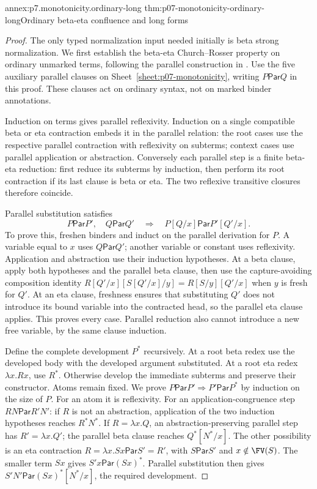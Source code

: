 \begin{annexitem}{annex:p7.monotonicity.ordinary-long}
 {thm:p07-monotonicity-ordinary-long}{Ordinary beta-eta confluence and long forms}
\begin{proof}
The only typed normalization input needed initially is beta strong
normalization. We first establish the beta-eta Church--Rosser property on
ordinary unmarked terms, following the parallel construction in
\cite[Section 4.4]{Selinger2013LambdaNotesV2}.
Use the five auxiliary parallel clauses on
Sheet~\ref{sheet:p07-monotonicity}, writing \(P\mathrel{\mathsf{Par}}Q\)
in this proof. These clauses act on ordinary syntax, not on marked
binder annotations.

Induction on terms gives parallel reflexivity. Induction on a single
compatible beta or eta contraction embeds it in the parallel relation:
the root cases use the respective parallel contraction with reflexivity
on subterms; context cases use parallel application or abstraction.
Conversely each parallel step is a finite beta-eta reduction: first reduce
its subterms by induction, then perform its root contraction if its last
clause is beta or eta. The two reflexive transitive closures therefore
coincide.

Parallel substitution satisfies
\[
 P\mathrel{\mathsf{Par}}P',\quad Q\mathrel{\mathsf{Par}}Q'
 \quad\Longrightarrow\quad
 P[Q/x]\mathrel{\mathsf{Par}}P'[Q'/x].
\]
To prove this, freshen binders and induct on the parallel derivation for
\(P\). A variable equal to \(x\) uses \(Q\mathrel{\mathsf{Par}}Q'\);
another variable or constant uses reflexivity. Application and abstraction
use their induction hypotheses. At a beta clause, apply both hypotheses
and the parallel beta clause, then use the capture-avoiding composition
identity
\(R[Q'/x][S[Q'/x]/y]=R[S/y][Q'/x]\) when \(y\) is fresh for \(Q'\).
At an eta clause, freshness ensures that substituting \(Q'\) does not
introduce its bound variable into the contracted head, so the parallel eta
clause applies. This proves every case. Parallel reduction also cannot
introduce a new free variable, by the same clause induction.

Define the complete development \(P^*\) recursively. At a root beta
redex use the developed body with the developed argument substituted.
At a root eta redex \(\lambda x.Rx\), use \(R^*\).
Otherwise develop the immediate subterms and preserve their constructor.
Atoms remain fixed. We prove
\(P\mathrel{\mathsf{Par}}P'\Rightarrow
  P'\mathrel{\mathsf{Par}}P^*\)
by induction on the size of \(P\).
For an atom it is reflexivity.
For an application-congruence step \(RN\mathrel{\mathsf{Par}}R'N'\):
if \(R\) is not an abstraction, application of the two induction
hypotheses reaches \(R^*N^*\).
If \(R=\lambda x.Q\), an abstraction-preserving parallel step has
\(R'=\lambda x.Q'\); the parallel beta clause reaches \(Q^*[N^*/x]\).
The other possibility is an eta contraction
\(R=\lambda x.Sx\mathrel{\mathsf{Par}}S'=R'\), with
\(S\mathrel{\mathsf{Par}}S'\) and \(x\notin\FV(S)\).
The smaller term \(Sx\) gives
\(S'x\mathrel{\mathsf{Par}}(Sx)^*\).
Parallel substitution then gives
\(S'N'\mathrel{\mathsf{Par}}(Sx)^*[N^*/x]\), the required development.


\end{proof}
\end{annexitem}

